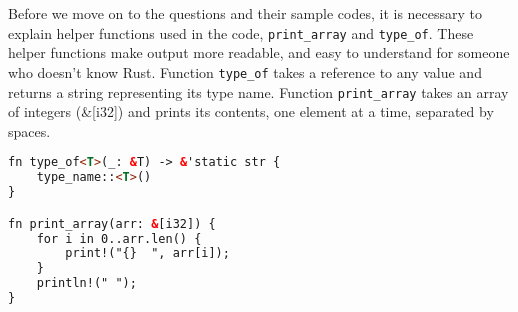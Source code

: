 \documentclass{article}
\begin{document}
Before we move on to the questions and their sample codes, it is necessary to explain helper functions used in the code, \texttt{print\_array} and \texttt{type\_of}. These helper functions make output more readable, and easy to understand for someone who doesn't know Rust. Function \texttt{type\_of}  takes a reference to any value and returns a string representing its type name. Function \texttt{print\_array} takes an array of integers (\&[i32]) and prints its contents, one element at a time, separated by spaces.


\begin{lstlisting}[language=HTML]
fn type_of<T>(_: &T) -> &'static str {
    type_name::<T>()
}

fn print_array(arr: &[i32]) {
    for i in 0..arr.len() {
        print!("{}  ", arr[i]);
    }
    println!(" ");
}
\end{lstlisting}
\end{document}
